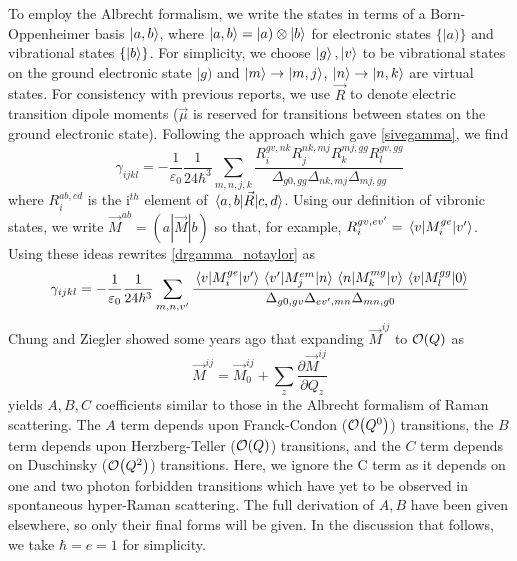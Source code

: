 \documentclass[aip, jcp, reprint, onecolumn]{revtex4-2}
\begin{document}
To employ the Albrecht formalism, we write the states in terms of a Born-Oppenheimer basis $\ket{a,b}$, where $\ket{a,b} = |a) \otimes \ket{b}$ for electronic states $\{|a)\}$ and vibrational states $\{\ket{b}\}$. \cite{BornOppenheimer, Albrecht1960}
For simplicity, we choose $\ket{g}, \ket{v}$ to be vibrational states on the ground electronic state $|g)$ and $\ket{m} \rightarrow \ket{m,j}$, $\ket{n} \rightarrow \ket{n,k}$ are virtual states.
For consistency with previous reports, we use $\vec{R}$ to denote electric transition dipole moments ($\vec{\mu}$ is reserved for transitions between states on the ground electronic state). \cite{Ziegler1974}
Following the approach which gave \autoref{sivegamma}, we find
\begin{equation}\label{drgamma_notaylor}
	\gamma_{ijkl} = -\frac{1}{\varepsilon_0} \frac{1}{24 \hbar^3} \sum_{m,n,j,k} \frac{
		R_{i}^{gv, nk} 
		R_{j}^{nk,mj} 
		R_{k}^{mj,gg} 
		R_{l}^{gv,gg} 
	}{\Delta_{g0,gg}
		\Delta_{nk, mj}
		\Delta_{mj, gg}
	}
\end{equation}
where $R_{i}^{ab,cd}$ is the i$^{th}$ element of $\mel{a,b}{\vec{R}}{c,d}$.\cite{Ziegler1988}
Using our definition of vibronic states, we write $\vec{M}^{ab} = (a|\vec{M}|b)$ so that, for example,
$R_{i}^{gv,ev'} = \mel{v}{M_i^{ge}}{v'}$.\cite{Albrecht1960}
Using these ideas rewrites \autoref{drgamma_notaylor} as
\begin{equation}\label{drgamma_notaylor_1}
	\begin{split}
		\gamma_{ijkl} &= -\frac{1}{\varepsilon_0} \frac{1}{24 \hbar^3} \sum_{m,n,v'} \frac{
			\mel{v}{M_{i}^{ge}}{v'} 
			\mel{v'}{M_{j}^{em}}{n}
			\mel{n}{M_{k}^{mg} }{v}
			\mel{v}{M_{l}^{gg}}{0}
		}{\Delta_{g0,gv}
			\Delta_{ev', mn}
			\Delta_{mn, g0}	} \\
	\end{split}
\end{equation}
Chung and Ziegler showed some years ago that expanding $\vec{M}^{ij}$ to $\order{Q}$ as
\begin{equation}
\vec{M}^{ij} = \vec{M}^{ij}_0 + \sum_z \frac{\partial\vec{M}^{ij}}{\partial Q_z}
\end{equation} yields $A, B, C$ coefficients similar to those in the Albrecht formalism of Raman scattering. \cite{Albrecht1961, Ziegler1988}
The $A$ term depends upon Franck-Condon ($\order{Q^0}$) transitions, the $B$ term depends upon Herzberg-Teller ($\order{Q}$) transitions, and the $C$ term depends on Duschinsky ($\order{Q^2}$) transitions. 
Here, we ignore the C term as it depends on one and two photon forbidden transitions which have yet to be observed in spontaneous hyper-Raman scattering. \cite{Ziegler1988}
The full derivation of $A,B$ have been given elsewhere, so only their final forms will be given.
In the discussion that follows, we take $\hbar = e = 1$ for simplicity.
\end{document}
